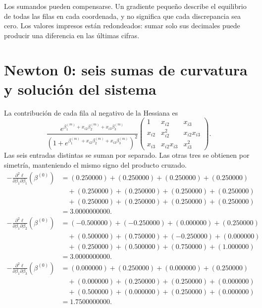 \documentclass[11pt,a4paper]{article}
\begin{document}
Los sumandos pueden compensarse.
Un gradiente pequeño describe el equilibrio de todas las filas
en cada coordenada, y no significa que cada discrepancia sea cero.
Los valores impresos están redondeados: sumar solo sus decimales
puede producir una diferencia en las últimas cifras.

\clearpage
\section{Newton 0: seis sumas de curvatura y solución del sistema}\label{logit97}
\begingroup\small
\setlength{\abovedisplayskip}{3pt}\setlength{\belowdisplayskip}{3pt}
\setlength{\jot}{2pt}\setlength{\parskip}{3pt}
La contribución de cada fila al negativo de la Hessiana es
\[
\frac{e^{\beta_1^{(m)}+x_{i2}\beta_2^{(m)}+x_{i3}\beta_3^{(m)}}}
{(1+e^{\beta_1^{(m)}+x_{i2}\beta_2^{(m)}+x_{i3}\beta_3^{(m)}})^2}
\begin{pmatrix}
1&x_{i2}&x_{i3}\\
x_{i2}&x_{i2}^2&x_{i2}x_{i3}\\
x_{i3}&x_{i2}x_{i3}&x_{i3}^2
\end{pmatrix}.
\]
Las seis entradas distintas se suman por separado.
Las otras tres se obtienen por simetría, manteniendo el
mismo signo del producto cruzado.
\[
\begin{aligned}
-\frac{\partial^2\ell}{\partial\beta_1\partial\beta_1}(\beta^{(0)})&=(0.250000)+(0.250000)+(0.250000)+(0.250000)\\&\quad+(0.250000)+(0.250000)+(0.250000)+(0.250000)\\&\quad+(0.250000)+(0.250000)+(0.250000)+(0.250000)\\&=3.0000000000.\end{aligned}
\]
\[
\begin{aligned}
-\frac{\partial^2\ell}{\partial\beta_1\partial\beta_2}(\beta^{(0)})&=(-0.500000)+(-0.250000)+(0.000000)+(0.250000)\\&\quad+(0.500000)+(0.750000)+(-0.250000)+(0.000000)\\&\quad+(0.250000)+(0.500000)+(0.750000)+(1.000000)\\&=3.0000000000.\end{aligned}
\]
\[
\begin{aligned}
-\frac{\partial^2\ell}{\partial\beta_1\partial\beta_3}(\beta^{(0)})&=(0.000000)+(0.250000)+(0.000000)+(0.250000)\\&\quad+(0.000000)+(0.250000)+(0.250000)+(0.000000)\\&\quad+(0.500000)+(0.000000)+(0.250000)+(0.000000)\\&=1.7500000000.\end{aligned}
\]
\end{document}
